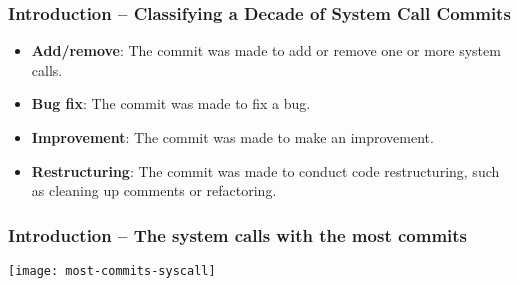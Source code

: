 \begin{frame}[plain]
	\frametitle{Introduction -- Classifying a Decade of System Call Commits}
	
	
	
	\centering
	\begin{itemize}\Large
		\item \textbf{Add/remove}: The commit was made to add or remove one or more system
		calls.
		
		\item \textbf{Bug fix}: The commit was made to fix a bug.
		\item \textbf{Improvement}: The commit was made to make an improvement.
		\item \textbf{Restructuring}: The commit was made to conduct code restructuring,
		such as cleaning up comments or refactoring.
		
	\end{itemize}
	
	
	
\end{frame}


\begin{frame}[plain]
	\frametitle{Introduction -- The system calls with the most commits}
	
	
	
	\centering

	\texttt{[image: most-commits-syscall]}

	
	
	
\end{frame}



